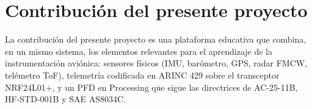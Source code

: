 \section{Contribución del presente proyecto}
\label{sec:ea_contribucion}

La contribución del presente proyecto es una plataforma educativa que combina, en un mismo sistema, los elementos relevantes para el aprendizaje de la instrumentación aviónica: sensores físicos (IMU, barómetro, GPS, radar FMCW, telémetro ToF), telemetría codificada en ARINC 429 sobre el transceptor NRF24L01+, y un PFD en Processing que sigue las directrices de AC-25-11B, HF-STD-001B y SAE AS8034C.